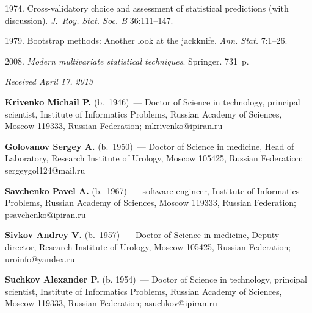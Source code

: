 \begin{multicols}{2}
{{\begin{thebibliography}{99}

 1974. Cross-validatory choice and assessment of statistical predictions (with 
discussion). \textit{J.~Roy. Stat. Soc. B} 36:111--147.



 1979. Bootstrap methods: Another look at the jackknife. \textit{Ann.  
Stat.}  7:1--26.

 2008. \textit{Modern multivariate statistical techniques}. Springer. 
731~p.


 
 
 
 

\end{thebibliography}
} }

\end{multicols}

\hfill{\small\textit{Received April 17, 2013}}

\Contr

\noindent
\textbf{Krivenko Michail P.} (b.\ 1946)~--- 
Doctor of Science in technology, principal scientist, Institute of Informatics 
Problems, Russian Academy of Sciences, Moscow 119333, Russian Federation;  mkrivenko@ipiran.ru

\vspace*{3pt}


\noindent\textbf{Golovanov Sergey  A.} (b.\ 1950)~--- Doctor of Science in medicine, Head of 
Laboratory, Research Institute of Urology, Moscow 105425, Russian Federation;
sergeygol124@mail.ru
 

\vspace*{3pt}

\noindent
\textbf{Savchenko Pavel A.} (b.\ 1967)~--- software engineer, Institute of Informatics 
Problems, Russian Academy of Sciences, Moscow 119333, Russian Federation;  
psavchenko@ipiran.ru

\vspace*{3pt}

\noindent
\textbf{Sivkov Andrey V.} (b.\ 1957)~--- Doctor of Science in medicine, Deputy director, 
Research Institute of Urology, Moscow 105425, Russian Federation;  uroinfo@yandex.ru

\vspace*{3pt}

\noindent
\textbf{Suchkov Alexander P.} (b. 1954)~--- Doctor of Science in technology, principal 
scientist, Institute of Informatics Problems, Russian Academy of Sciences, Moscow 119333, Russian Federation;  
asuchkov@ipiran.ru 

\label{end\stat}

\renewcommand{\bibname}{\protect\rm Литература}
